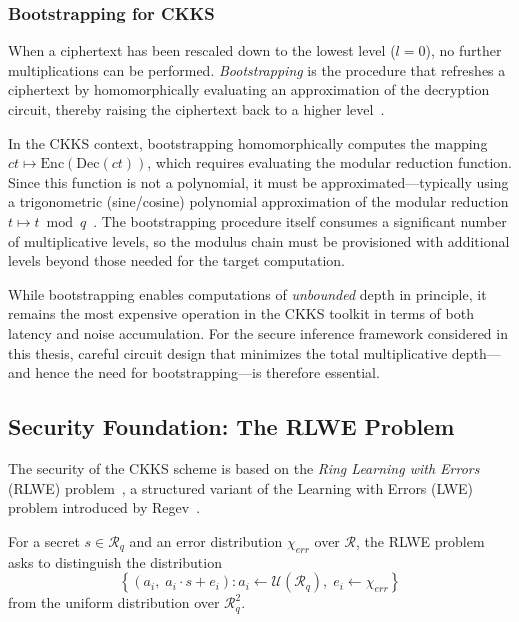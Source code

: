 \subsubsection{Bootstrapping for CKKS}
\label{sec:bootstrapping}

When a ciphertext has been rescaled down to the lowest level ($l = 0$), no further multiplications can be performed. \emph{Bootstrapping} is the procedure that refreshes a ciphertext by homomorphically evaluating an approximation of the decryption circuit, thereby raising the ciphertext back to a higher level~\cite{cheon2018bootstrapping}.

In the CKKS context, bootstrapping homomorphically computes the mapping $\mathit{ct} \mapsto \mathrm{Enc}(\mathrm{Dec}(\mathit{ct}))$, which requires evaluating the modular reduction function. Since this function is not a polynomial, it must be approximated---typically using a trigonometric (sine/cosine) polynomial approximation of the modular reduction $t \mapsto t \bmod q$~\cite{cheon2018bootstrapping, chen2019improved}. The bootstrapping procedure itself consumes a significant number of multiplicative levels, so the modulus chain must be provisioned with additional levels beyond those needed for the target computation.

While bootstrapping enables computations of \emph{unbounded} depth in principle, it remains the most expensive operation in the CKKS toolkit in terms of both latency and noise accumulation. For the secure inference framework considered in this thesis, careful circuit design that minimizes the total multiplicative depth---and hence the need for bootstrapping---is therefore essential.

\subsection{Security Foundation: The RLWE Problem}

The security of the CKKS scheme is based on the \emph{Ring Learning with Errors} (RLWE) problem~\cite{lyubashevsky2010ideal}, a structured variant of the Learning with Errors (LWE) problem introduced by Regev~\cite{regev2005lattices}.

\begin{definition}
For a secret $s \in \mathcal{R}_q$ and an error distribution $\chi_{\mathit{err}}$ over $\mathcal{R}$, the RLWE problem asks to distinguish the distribution
\begin{equation}
    \left\{ \left(a_i,\; a_i \cdot s + e_i\right) : a_i \leftarrow \mathcal{U}(\mathcal{R}_q),\; e_i \leftarrow \chi_{\mathit{err}} \right\}
\end{equation}
from the uniform distribution over $\mathcal{R}_q^2$.
\end{definition}

